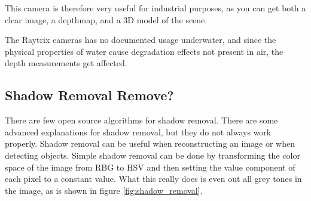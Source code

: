 

This camera is therefore very useful for industrial purposes, as you can get both a clear image, a depthmap, and a 3D model of the scene.

 The Raytrix cameras has no documented usage underwater, and since the physical properties of water cause degradation effects not present in air, the depth measurements get affected.




\subsection{Shadow Removal {\color{red}Remove?}}
There are few open source algorithms for shadow removal. There are some advanced explanations for shadow removal, but they do not always work properly. Shadow removal can be useful when reconstructing an image or when detecting objects. 
Simple shadow removal can be done by transforming the color space of the image from RBG to HSV and then setting the value component of each pixel to a constant value. What this really does is even out all grey tones in the image, as is shown in figure \ref{fig:shadow_removal}.


